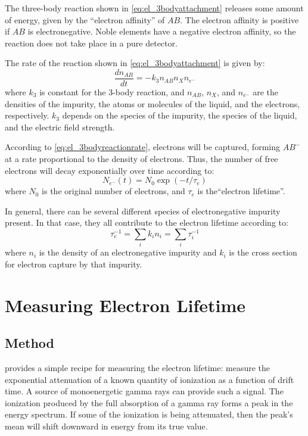 \documentclass[herrin-thesis.tex]{subfiles}
\begin{document}
The three-body reaction shown in \cref{eq:el_3bodyattachment} releases some amount of energy, given by the ``electron affinity'' of \(AB\). The electron affinity is positive if \(AB\) is electronegative. Noble elements have a negative electron affinity, so the reaction does not take place in a pure detector.

The rate of the reaction shown in \cref{eq:el_3bodyattachment} is given by:
\begin{equation}
\frac{dn_{AB}}{dt} = -k_{3} n_{AB} n_{X} n_{e^{-}}
\label{eq:el_3bodyreactionrate}
\end{equation}
where \(k_3\) is constant for the 3-body reaction, and \(n_{AB}\), \(n_{X}\), and \(n_{e^{-}}\) are the densities of the impurity, the atoms or molecules of the liquid, and the electrons, respectively. \(k_3\) depends on the species of the impurity, the species of the liquid, and the electric field strength.

According to \cref{eq:el_3bodyreactionrate}, electrons will be captured, forming \(AB^{-}\) at a rate proportional to the density of electrons. Thus, the number of free electrons will decay exponentially over time according to:
\begin{equation}
N_{e^{-}}(t) = N_0 \exp (-t/\tau_e)
\label{eq:el_exponentialtaue}
\end{equation}
where \(N_0\) is the original number of electrons, and \(\tau_e\) is the``electron lifetime''.

In general, there can be several different species of electronegative impurity present. In that case, they all contribute to the electron lifetime according to:
\begin{equation}
\tau_e^{-1} = \sum_i k_i n_i = \sum_i\tau_i^{-1}
\label{eq:el_tauedefinition}
\end{equation}
where \(n_i\) is the density of an electronegative impurity and \(k_i\) is the cross section for electron capture by that impurity.

\section{Measuring Electron Lifetime}

\subsection{Method}
 provides a simple recipe for measuring the electron lifetime: measure the exponential attenuation of a known quantity of ionization as a function of drift time. A source of monoenergetic gamma rays can provide such a signal. The ionization produced by the full absorption of a gamma ray forms a peak in the energy spectrum. If some of the ionization is being attenuated, then the peak's mean will shift downward in energy from its true value.
\end{document}
